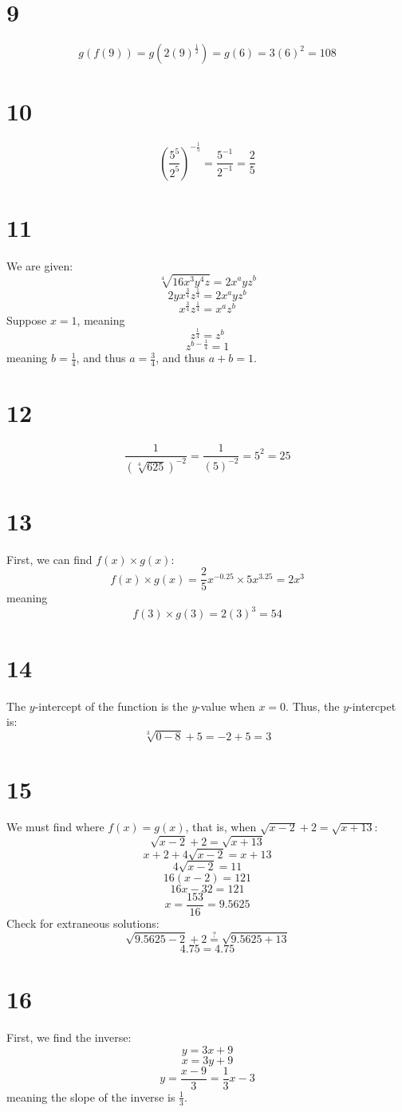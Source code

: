 \documentclass{article}
\theoremstyle{definition}
\newcommand{\?}{\stackrel{?}{=}}
\begin{document}
\section*{9}
\[ g(f(9))=g(2(9)^\frac{1}{2})=g(6)=3(6)^2=108 \]

\section*{10} 
\[ (\frac{5^5}{2^5})^{-\frac{1}{5}}=\frac{5^{-1}}{2^{-1}}=\frac{2}{5} \]

\section*{11}
We are given:
\[ \sqrt[4]{16x^3y^4z}=2x^ayz^b \] \[ 2yx^\frac{3}{4}z^\frac{1}{4}=2x^ayz^b \] \[ x^\frac{3}{4}z^\frac{1}{4}=x^az^b \]
Suppose $x=1$, meaning \[ z^\frac{1}{4}=z^b \] \[ z^{b-\frac{1}{4}}=1 \] meaning $b=\frac{1}{4}$, and thus $a=\frac{3}{4}$, and 
thus $a+b=1$.


\section*{12}
\[ \frac{1}{(\sqrt[4]{625})^{-2}}=\frac{1}{(5)^{-2}}=5^2=25 \]

\section*{13}
First, we can find $f(x)\times g(x)$:
\[ f(x)\times g(x)=\frac{2}{5}x^{-0.25}\times 5x^{3.25}=2x^3 \] meaning \[ f(3)\times g(3)=2(3)^3=54 \]

\section*{14}
The $y$-intercept of the function is the $y$-value when $x=0$. Thus, the $y$-intercpet is:
\[ \sqrt[3]{0-8}+5=-2+5=3 \]

\section*{15}
We must find where $f(x)=g(x)$, that is, when $\sqrt{x-2}+2=\sqrt{x+13}$:
\[ \sqrt{x-2}+2=\sqrt{x+13} \] \[ x+2+4\sqrt{x-2}=x+13 \] \[ 4\sqrt{x-2}=11 \] \[ 16(x-2)=121 \] \[ 16x-32=121 \] \[ x=\frac{153}{16}=9.5625 \]
Check for extraneous solutions:
\[ \sqrt{9.5625-2}+2\?\sqrt{9.5625+13} \] \[ 4.75=4.75 \]

\section*{16}
First, we find the inverse:
\[ y=3x+9 \] \[ x=3y+9 \] \[ y=\frac{x-9}{3}=\frac{1}{3}x-3 \] meaning the slope of the inverse is $\frac{1}{3}$.
\end{document}
